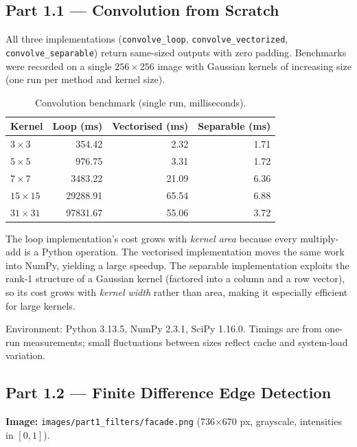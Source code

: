 \documentclass[12pt,a4paper]{article}
\begin{document}
\subsection{Part 1.1 \texorpdfstring{---}{-} Convolution from Scratch}

All three implementations (\texttt{convolve\_loop}, \texttt{convolve\_vectorized},
\texttt{convolve\_separable}) return same-sized outputs with zero padding.
Benchmarks were recorded on a single $256\times256$ image with Gaussian kernels
of increasing size (one run per method and kernel size).

\begin{table}[H]
  \centering
  \caption{Convolution benchmark (single run, milliseconds).}
  \label{tab:conv_bench}
  \begin{tabular}{lrrr}
    \toprule
    \textbf{Kernel} & \textbf{Loop (ms)} & \textbf{Vectorised (ms)} & \textbf{Separable (ms)} \\
    \midrule
    $3\times3$   &    354.42 &   2.32 & 1.71 \\
    $5\times5$   &    976.75 &   3.31 & 1.72 \\
    $7\times7$   &  3483.22  &  21.09 & 6.36 \\
    $15\times15$ & 29288.91  &  65.54 & 6.88 \\
    $31\times31$ & 97831.67  &  55.06 & 3.72 \\
    \bottomrule
  \end{tabular}
\end{table}

The loop implementation's cost grows with \emph{kernel area} because every
multiply-add is a Python operation.  The vectorised implementation moves the
same work into NumPy, yielding a large speedup.  The separable implementation
exploits the rank-1 structure of a Gaussian kernel (factored into a column and
a row vector), so its cost grows with \emph{kernel width} rather than area,
making it especially efficient for large kernels.

Environment: Python 3.13.5, NumPy 2.3.1, SciPy 1.16.0.  Timings are from
one-run measurements; small fluctuations between sizes reflect cache and
system-load variation.

\subsection{Part 1.2 \texorpdfstring{---}{-} Finite Difference Edge Detection}

\textbf{Image:} \texttt{images/part1\_filters/facade.png}
(736$\times$670 px, grayscale, intensities in $[0,1]$).
\end{document}
